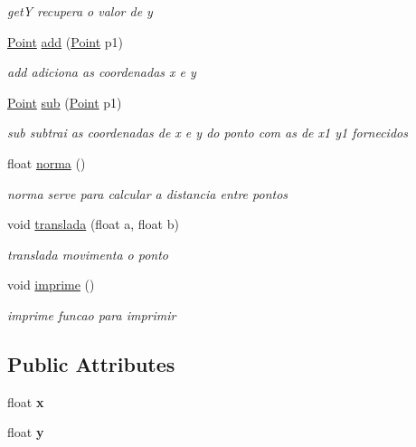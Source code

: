 \begin{DoxyCompactItemize}
\begin{DoxyCompactList}\small\item\em getY recupera o valor de y \end{DoxyCompactList}\item 
\hyperlink{classPoint}{Point} \hyperlink{classPoint_a9dbea84b07b0a8ec3bbb9e58b3d15899}{add} (\hyperlink{classPoint}{Point} p1)
\begin{DoxyCompactList}\small\item\em add adiciona as coordenadas x e y \end{DoxyCompactList}\item 
\hyperlink{classPoint}{Point} \hyperlink{classPoint_a9cf2c53b0a4e6282a6712824bb4e9b00}{sub} (\hyperlink{classPoint}{Point} p1)
\begin{DoxyCompactList}\small\item\em sub subtrai as coordenadas de x e y do ponto com as de x1 y1 fornecidos \end{DoxyCompactList}\item 
float \hyperlink{classPoint_abd2618d1f505d9392893273a66e7c9b2}{norma} ()
\begin{DoxyCompactList}\small\item\em norma serve para calcular a distancia entre pontos \end{DoxyCompactList}\item 
void \hyperlink{classPoint_ad9676e36f3444534b609e3c68422239a}{translada} (float a, float b)
\begin{DoxyCompactList}\small\item\em translada movimenta o ponto \end{DoxyCompactList}\item 
void \hyperlink{classPoint_a1fb5c2501c27ab2cbc99d06c2a26a741}{imprime} ()\hypertarget{classPoint_a1fb5c2501c27ab2cbc99d06c2a26a741}{}\label{classPoint_a1fb5c2501c27ab2cbc99d06c2a26a741}

\begin{DoxyCompactList}\small\item\em imprime funcao para imprimir \end{DoxyCompactList}\end{DoxyCompactItemize}
\subsection*{Public Attributes}
\begin{DoxyCompactItemize}
\item 
float {\bfseries x}\hypertarget{classPoint_a05dfe2dfbde813ad234b514f30e662f1}{}\label{classPoint_a05dfe2dfbde813ad234b514f30e662f1}

\item 
float {\bfseries y}\hypertarget{classPoint_a6101960c8d2d4e8ea1d32c9234bbeb8d}{}\label{classPoint_a6101960c8d2d4e8ea1d32c9234bbeb8d}

\end{DoxyCompactItemize}


